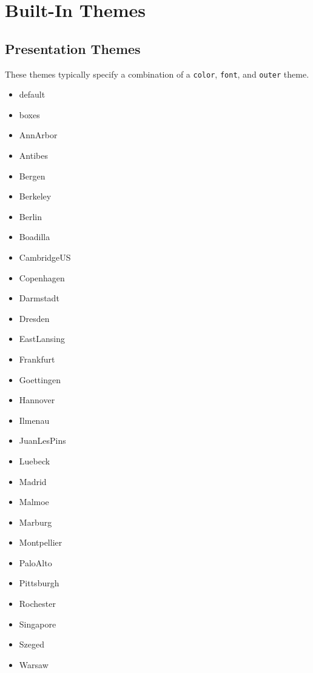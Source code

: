 \section<1-| beamer:0>{Built-In Themes}\label{sec:builtin-themes}

\subsection{Presentation Themes}\label{subsec:presentation-themes}

These themes typically specify a combination of a \texttt{color}, \texttt{font},  and \texttt{outer} theme.

\ttfamily
\begin{multicols}{4}\raggedcolumns
\begin{itemize}
  \item default
  \item boxes
  \item AnnArbor
  \item Antibes
  \item Bergen
  \item Berkeley
  \item Berlin
  \item Boadilla
  \item CambridgeUS
  \item Copenhagen
  \item Darmstadt
  \item Dresden
  \item EastLansing
  \item Frankfurt
  \item Goettingen
  \item Hannover
  \item Ilmenau
  \item JuanLesPins
  \item Luebeck
  \item Madrid
  \item Malmoe
  \item Marburg
  \item Montpellier
  \item PaloAlto
  \item Pittsburgh
  \item Rochester
  \item Singapore
  \item Szeged
  \item Warsaw
\end{itemize}
\end{multicols}
